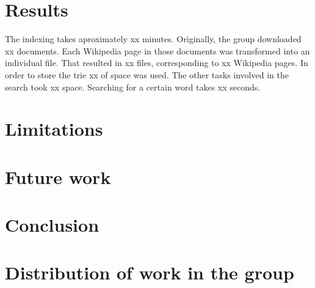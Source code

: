\documentclass{article}
\begin{document}

\section*{Results}
The indexing takes aproximately xx minutes. Originally, the group downloaded xx documents. Each Wikipedia page in those documents was transformed into an individual file. That resulted in xx files, corresponding to xx Wikipedia pages. In order to store the trie xx of space was used. The other tasks involved in the search took xx space. Searching for a certain word takes xx seconds. 

\section*{Limitations}

\section*{Future work}

\section*{Conclusion}

\section*{Distribution of work in the group}
\end{document}
